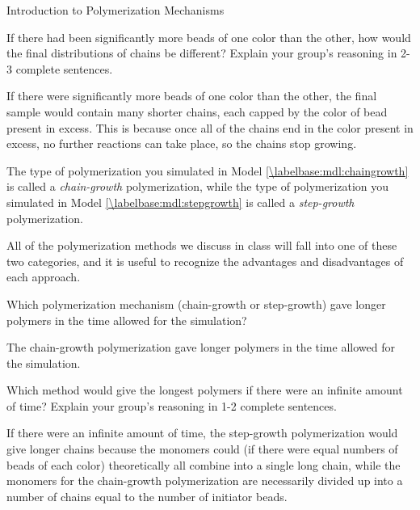 \begin{activity}{Introduction to Polymerization Mechanisms}
\begin{ctqs}
	\question If there had been significantly more beads of one color than the other, how would the final distributions of chains be different?  Explain your group's reasoning in 2-3 complete sentences.
	
		\begin{solution}[1.75in]
			If there were significantly more beads of one color than the other, the final sample would contain many shorter chains, each capped by the color of bead present in excess.  This is because once all of the chains end in the color present in excess, no further reactions can take place, so the chains stop growing.
		\end{solution}
	
\end{ctqs}

\begin{infobox}
	The type of polymerization you simulated in Model  \ref{\labelbase:mdl:chaingrowth} is called a \emph{chain-growth} polymerization, while the type of polymerization you simulated in Model  \ref{\labelbase:mdl:stepgrowth} is called a \emph{step-growth} polymerization.
	
	All of the polymerization methods we discuss in class will fall into one of these two categories, and it is useful to recognize the advantages and disadvantages of each approach.
\end{infobox}

\begin{ctqs}
	\question Which polymerization mechanism (chain-growth or step-growth) gave longer polymers in the time allowed for the simulation?
	
		\begin{solution}[1in]
			The chain-growth polymerization gave longer polymers in the time allowed for the simulation.
		\end{solution}
	
	\question Which method would give the longest polymers if there were an infinite amount of time?  Explain your group's reasoning in 1-2 complete sentences.
	
		\begin{solution}[1.75in]
			If there were an infinite amount of time, the step-growth polymerization would give longer chains because the monomers could (if there were equal numbers of beads of each color) theoretically all combine into a single long chain, while the monomers for the chain-growth polymerization are necessarily divided up into a number of chains equal to the number of initiator beads.
		\end{solution}
	

\end{ctqs}
\end{activity}
